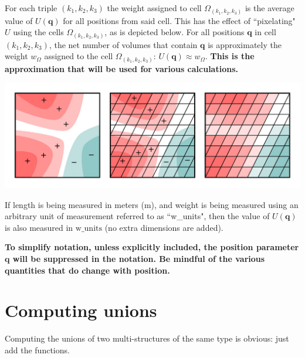 For each triple \((k_1, k_2, k_3)\) the weight assigned to cell \(\Omega_{(k_1, k_2, k_3)}\) is the average value of \(U(\mathbf{q})\) for all positions from said cell. This has the effect of ``pixelating" \(U\) using the cells \(\Omega_{(k_1, k_2, k_3)}\), as is depicted below. For all positions \(\mathbf{q}\) in cell \((k_1, k_2, k_3)\), the net number of volumes that contain \(\mathbf{q}\) is approximately the weight \(w_{\Omega}\) assigned to the cell \(\Omega_{(k_1, k_2, k_3)}\): \(U(\mathbf{q}) \approx w_{\Omega}\). {\bf This is the approximation that will be used for various calculations.} 

\begin{center}
\includegraphics[width = \textwidth]{Coordinate_systems/volume_pixelation}
\end{center}

If length is being measured in meters (m), and weight is being measured using an arbitrary unit of measurement referred to as ``w\_units", then the value of \(U(\mathbf{q})\) is also measured in \(\text{w\_units}\) (no extra dimensions are added).

\vspace{5mm}

{\bf To simplify notation, unless explicitly included, the position parameter \(\mathbf{q}\) will be suppressed in the notation. Be mindful of the various quantities that do change with position.}



\section{Computing unions}

Computing the unions of two multi-structures of the same type is obvious: just add the functions.

